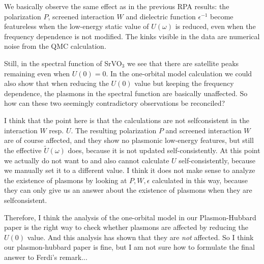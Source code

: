 \documentclass[12pt,a4paper]{scrartcl}
\numberwithin{equation}{section}
\begin{document}
We basically observe the same effect as in the previous RPA results:
the polarization $P$, screened interaction $W$ and dielectric function 
$\epsilon^{-1}$ become featureless when the low-energy static value of $U(\omega)$
is reduced, even when the frequency dependence is not modified.
The kinks visible in the data are numerical noise from the QMC calculation.

Still, in the spectral function of SrVO$_3$ we see that there are
satellite peaks remaining even when $U(0)=0$. 
In the one-orbital model calculation we could also show
that when reducing the $U(0)$ value but keeping the frequency dependence, 
the plasmons in the spectral function are basically
unaffected.
So how can these two seemingly contradictory observations be reconciled?

I think that the point here is that the calculations are not selfconsistent 
in the interaction $W$ resp. $U$.
The resulting polarization $P$ and screened interaction $W$
are of course affected, and they show no plasmonic low-energy features, but
still the effective $\tilde{U}(\omega)$ does, because it is not
updated self-consistently. 
At this point we actually do not want to and also cannot 
calculate $U$ self-consistently, because we manually set it to a different value.
I think it does not make sense to analyze the existence of plasmons by looking
at $P,W,\epsilon$ calculated in this way, because they can only give us 
an answer about the existence of plasmons when they are selfconsistent.

Therefore, I think the analysis of the one-orbital model in our 
Plasmon-Hubbard paper is the right way to check whether plasmons 
are affected by reducing the $U(0)$ value. And this analysis
has shown that they are \textit{not} affected.
So I think our plasmon-hubbard paper is fine, 
but I am not sure how to formulate the final answer to 
Ferdi's remark...

\clearpage
\end{document}
